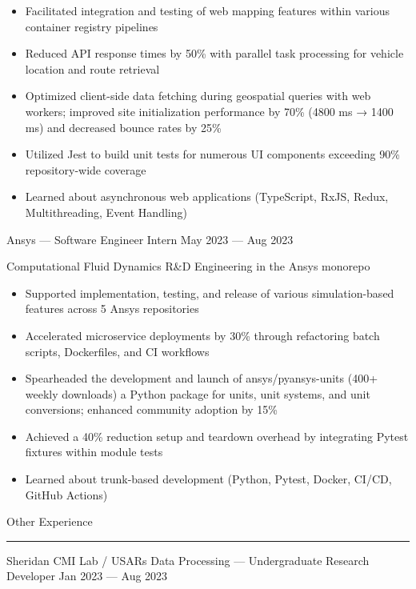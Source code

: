 \documentclass{article}
\begin{document}
\begin{itemize}
  	\item Facilitated integration and testing of web mapping features within various container registry pipelines
	\item Reduced API response times by 50\% with parallel task processing for vehicle location and route retrieval
	\item Optimized client-side data fetching during geospatial queries with web workers; improved site initialization performance by 70\% (4800 ms → 1400 ms) and decreased bounce rates by 25\% 
	\item Utilized Jest to build unit tests for numerous UI components exceeding 90\% repository-wide coverage
	\item Learned about asynchronous web applications (TypeScript, RxJS, Redux, Multithreading, Event Handling)
\end{itemize}

Ansys — Software Engineer Intern \hfill May 2023 — Aug 2023

Computational Fluid Dynamics R\&D Engineering in the Ansys monorepo

\begin{itemize}
	\item Supported implementation, testing, and release of various simulation-based features across 5 Ansys repositories
	\item Accelerated microservice deployments by 30\% through refactoring batch scripts, Dockerfiles, and CI workflows
	\item Spearheaded the development and launch of ansys/pyansys-units (400+ weekly downloads) a Python package for units, unit systems, and unit conversions; enhanced community adoption by 15\%
	\item Achieved a 40\% reduction setup and teardown overhead by integrating Pytest fixtures within module tests
	\item Learned about trunk-based development (Python, Pytest, Docker, CI/CD, GitHub Actions)
\end{itemize}


Other Experience \\
\noindent\rule[8pt]{\linewidth}{0.4pt}


Sheridan CMI Lab / USARs Data Processing — Undergraduate Research Developer \hfill Jan 2023 — Aug 2023
\end{document}
